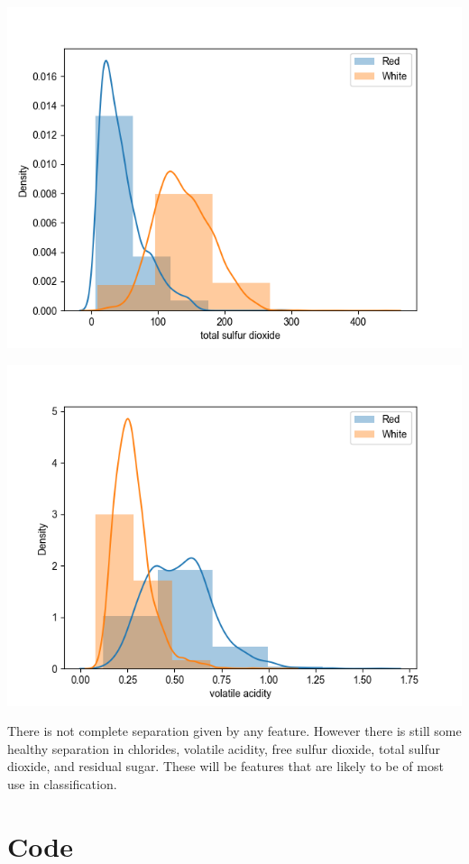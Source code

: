 \documentclass[12pt, letterpaper]{article}
\begin{document}
\includegraphics[scale=\myscale]{class_dist_total_sulfur_dioxide.png}

\includegraphics[scale=\myscale]{class_dist_volatile_acidity.png}

There is not complete separation given by any feature. However there is still some healthy separation in chlorides, volatile acidity, free sulfur dioxide, total sulfur dioxide, and residual sugar. These will be features that are likely to be of most use in classification.


\section{Code} %
\end{document}
